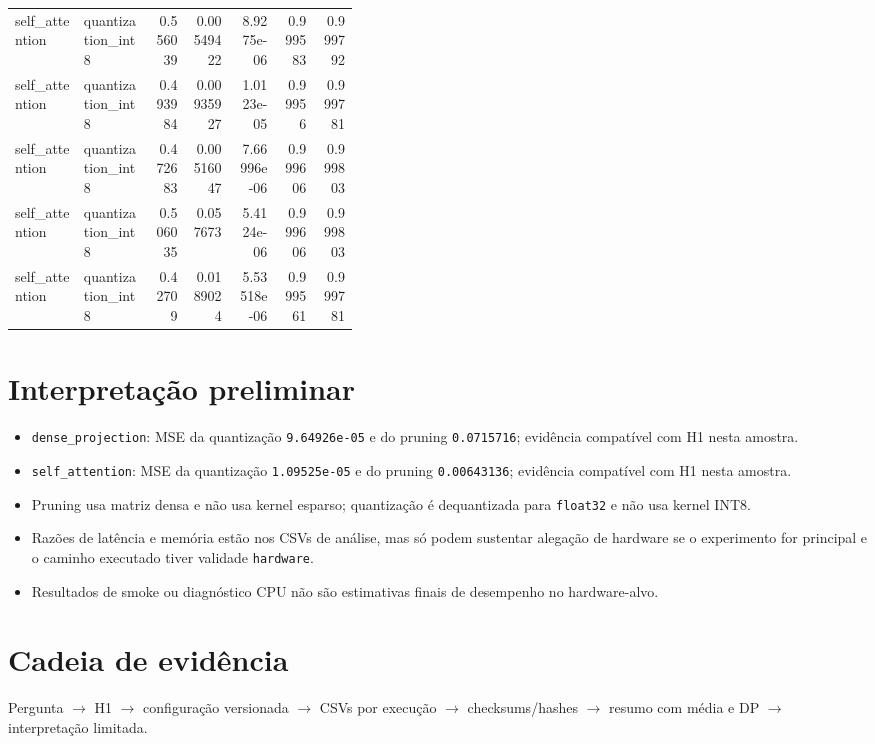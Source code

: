 \begin{landscape}
\begin{longtable}{@{}p{0.20\linewidth}p{0.20\linewidth}rrrrr@{}}
self\_\allowbreak{}attention & quantization\_\allowbreak{}int8 & 0.556039 & 0.00549422 & 8.9275e-06 & 0.999583 & 0.999792 \\
self\_\allowbreak{}attention & quantization\_\allowbreak{}int8 & 0.493984 & 0.00935927 & 1.0123e-05 & 0.99956 & 0.999781 \\
self\_\allowbreak{}attention & quantization\_\allowbreak{}int8 & 0.472683 & 0.00516047 & 7.66996e-06 & 0.999606 & 0.999803 \\
self\_\allowbreak{}attention & quantization\_\allowbreak{}int8 & 0.506035 & 0.057673 & 5.4124e-06 & 0.999606 & 0.999803 \\
self\_\allowbreak{}attention & quantization\_\allowbreak{}int8 & 0.42709 & 0.0189024 & 5.53518e-06 & 0.999561 & 0.999781 \\
\bottomrule
\end{longtable}
\end{landscape}

\section{Interpretação preliminar}

\begin{itemize}
\item \texttt{dense\_\allowbreak{}projection}: MSE da quantização \texttt{9.64926e-05} e do pruning \texttt{0.0715716}; evidência compatível com H1 nesta amostra.
\item \texttt{self\_\allowbreak{}attention}: MSE da quantização \texttt{1.09525e-05} e do pruning \texttt{0.00643136}; evidência compatível com H1 nesta amostra.
\item Pruning usa matriz densa e não usa kernel esparso; quantização é dequantizada para \texttt{float32} e não usa kernel INT8.
\item Razões de latência e memória estão nos CSVs de análise, mas só podem sustentar alegação de hardware se o experimento for principal e o caminho executado tiver validade \texttt{hardware}.
\item Resultados de smoke ou diagnóstico CPU não são estimativas finais de desempenho no hardware-alvo.
\end{itemize}

\section{Cadeia de evidência}

Pergunta $\rightarrow$ H1 $\rightarrow$ configuração versionada $\rightarrow$ CSVs por execução $\rightarrow$ checksums/hashes $\rightarrow$ resumo com média e DP $\rightarrow$ interpretação limitada.


